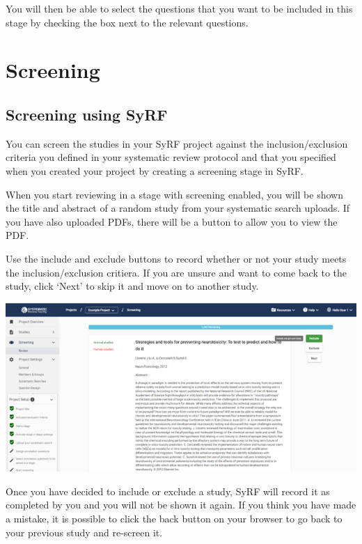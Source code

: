 \documentclass[
]{book}
\begin{document}
You will then be able to select the questions that you want to be included in this stage by checking the box next to the relevant questions.

\hypertarget{projectscreening}{%
\chapter{Screening}\label{projectscreening}}

\hypertarget{screening-using-syrf}{%
\section{Screening using SyRF}\label{screening-using-syrf}}

You can screen the studies in your SyRF project against the inclusion/exclusion criteria you defined in your systematic review protocol and that you specified when you created your project by creating a screening stage in SyRF.

When you start reviewing in a stage with screening enabled, you will be shown the title and abstract of a random study from your systematic search uploads. If you have also uploaded PDFs, there will be a button to allow you to view the PDF.

Use the include and exclude buttons to record whether or not your study meets the inclusion/exclusion critiera. If you are unsure and want to come back to the study, click `Next' to skip it and move on to another study.

\includegraphics[width=10.01in]{figs/Fig_Screening}

Once you have decided to include or exclude a study, SyRF will record it as completed by you and you will not be shown it again. If you think you have made a mistake, it is possible to click the back button on your browser to go back to your previous study and re-screen it.
\end{document}
